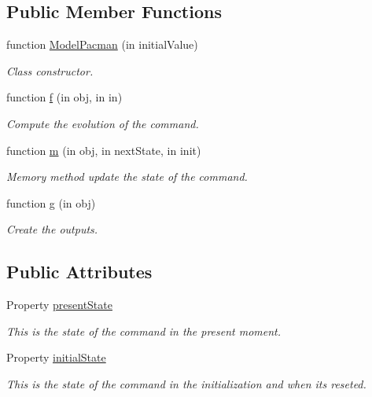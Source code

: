 \subsection*{Public Member Functions}
\begin{DoxyCompactItemize}
\item 
function \hyperlink{class_model_pacman_aeece945de8fe29ca408290f87392ac3d}{Model\+Pacman} (in initial\+Value)
\begin{DoxyCompactList}\small\item\em Class constructor. \end{DoxyCompactList}\item 
function \hyperlink{class_model_pacman_a6f3b146c92a207e95690d08975e1e072}{f} (in obj, in in)
\begin{DoxyCompactList}\small\item\em Compute the evolution of the command. \end{DoxyCompactList}\item 
function \hyperlink{class_model_pacman_a3140f24c6c4b80037b7d4f521c6ae2d3}{m} (in obj, in next\+State, in init)
\begin{DoxyCompactList}\small\item\em Memory method update the state of the command. \end{DoxyCompactList}\item 
function \hyperlink{class_model_pacman_a07dadfabe92bf9a144b8a862720e7746}{g} (in obj)
\begin{DoxyCompactList}\small\item\em Create the outputs. \end{DoxyCompactList}\end{DoxyCompactItemize}
\subsection*{Public Attributes}
\begin{DoxyCompactItemize}
\item 
Property \hyperlink{class_model_pacman_a9624cc7c421a50fa5086b0ebd0cd5fe3}{present\+State}
\begin{DoxyCompactList}\small\item\em This is the state of the command in the present moment. \end{DoxyCompactList}\item 
Property \hyperlink{class_model_pacman_acd9263acfa96c9138afdf497e55acc24}{initial\+State}
\begin{DoxyCompactList}\small\item\em This is the state of the command in the initialization and when it\textquotesingle{}s reseted. \end{DoxyCompactList}\end{DoxyCompactItemize}


